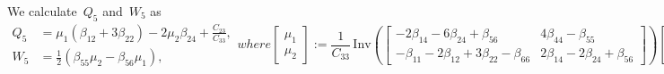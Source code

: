 \documentclass[preprint,10pt,times]{elsarticle}
\numberwithin{equation}{section}
\newcommand{\pr}[1]{\left( #1 \right)}
\newcommand{\Inv}{\,\mathrm{Inv}}
\renewcommand{\>}{$\Rightarrow$}
\begin{document}
We calculate~$Q_5$ and~$W_5$ as
\begin{subequations}
	\begin{align}
	Q_5 & = \mu_1(\beta_{12} + 3\beta_{22})-2\mu_2\beta_{24} + \frac{C_{23}}{C_{33}}, \\
	W_5 & = \frac{1}{2}(\beta_{55}\mu_2 - \beta_{56}\mu_1),
	\end{align}
	where
	\begin{equation}
	\begin{bmatrix}
		\mu_1 \\ \mu_2
	\end{bmatrix} :=
	\frac{1}{C_{33}}
	\Inv \pr{\begin{bmatrix}
		-2\beta_{14}-6\beta_{24}+\beta_{56} & 4\beta_{44}-\beta_{55} \\
		-\beta_{11}-2\beta_{12}+3\beta_{22}-\beta_{66} & 2\beta_{14}-2\beta_{24}+\beta_{56}
	\end{bmatrix}}
	\begin{bmatrix}
			2C_{34} \\ C_{13}-C_{23}
	\end{bmatrix}.
	\end{equation}
\end{subequations}
\end{document}
